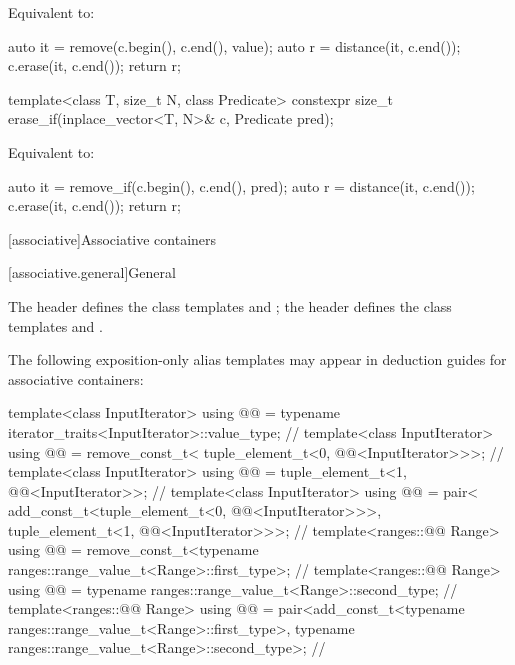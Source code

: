 \begin{itemdescr}
\pnum
\effects
Equivalent to:
\begin{codeblock}
auto it = remove(c.begin(), c.end(), value);
auto r = distance(it, c.end());
c.erase(it, c.end());
return r;
\end{codeblock}
\end{itemdescr}

%
\begin{itemdecl}
template<class T, size_t N, class Predicate>
  constexpr size_t erase_if(inplace_vector<T, N>& c, Predicate pred);
\end{itemdecl}

\begin{itemdescr}
\pnum
\effects
Equivalent to:
\begin{codeblock}
auto it = remove_if(c.begin(), c.end(), pred);
auto r = distance(it, c.end());
c.erase(it, c.end());
return r;
\end{codeblock}
\end{itemdescr}

[associative]{Associative containers}

[associative.general]{General}

\pnum
The header  defines the class templates
 and ;
the header  defines the class templates
 and .

\pnum
The following exposition-only alias templates may appear in deduction guides for associative containers:
\begin{codeblock}
template<class InputIterator>
  using @@ =
    typename iterator_traits<InputIterator>::value_type;                // \expos
template<class InputIterator>
  using @@ = remove_const_t<
    tuple_element_t<0, @@<InputIterator>>>;                // \expos
template<class InputIterator>
  using @@ =
    tuple_element_t<1, @@<InputIterator>>;                 // \expos
template<class InputIterator>
  using @@ = pair<
    add_const_t<tuple_element_t<0, @@<InputIterator>>>,
    tuple_element_t<1, @@<InputIterator>>>;                // \expos
template<ranges::@@ Range>
  using @@ =
    remove_const_t<typename ranges::range_value_t<Range>::first_type>;  // \expos
template<ranges::@@ Range>
  using @@ = typename ranges::range_value_t<Range>::second_type; // \expos
template<ranges::@@ Range>
  using @@ =
    pair<add_const_t<typename ranges::range_value_t<Range>::first_type>,
         typename ranges::range_value_t<Range>::second_type>;           // \expos
\end{codeblock}

